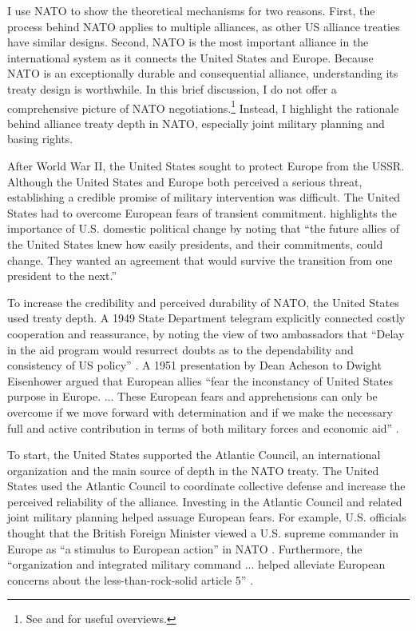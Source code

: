 \documentclass[12pt]{article}
\begin{document}
I use NATO to show the theoretical mechanisms for two reasons. 
First, the process behind NATO applies to multiple alliances, as other US alliance treaties have similar designs. 
Second, NATO is the most important alliance in the international system as it connects the United States and Europe. 
Because NATO is an exceptionally durable and consequential alliance, understanding its treaty design is worthwhile. 
In this brief discussion, I do not offer a comprehensive picture of NATO negotiations.\footnote{See \citet{Kaplan2007} and \citet{Poast2019a} for useful overviews.} 
Instead, I highlight the rationale behind alliance treaty depth in NATO, especially joint military planning and basing rights. 


After World War II, the United States sought to protect Europe from the USSR. 
Although the United States and Europe both perceived a serious threat, establishing a credible promise of military intervention was difficult. 
The United States had to overcome European fears of transient commitment.
\citet[pg. 14]{Sayle2019} highlights the importance of U.S. domestic political change by noting that ``the future allies of the United States knew how easily presidents, and their commitments, could change. They wanted an agreement that would survive the transition from one president to the next.'' 


To increase the credibility and perceived durability of NATO, the United States used treaty depth.  
A 1949 State Department telegram explicitly connected costly cooperation and reassurance, by noting the view of two ambassadors that ``Delay in the aid program would resurrect doubts as to the dependability and consistency of US policy'' \citep{state-summary-0607-49}. 
A 1951 presentation by Dean Acheson to Dwight Eisenhower argued that European allies ``fear the inconstancy of United States purpose in Europe. ... These European fears and apprehensions can only be overcome if we move forward with determination and if we make the necessary full and active contribution in terms of both military forces and economic aid'' \citep[pg. 3]{Acheson1951}. 


To start, the United States supported the Atlantic Council, an international organization and the main source of depth in the NATO treaty. 
The United States used the Atlantic Council to coordinate collective defense and increase the perceived reliability of the alliance. 
Investing in the Atlantic Council and related joint military planning helped assuage European fears. 
For example, U.S. officials thought that the British Foreign Minister viewed a U.S. supreme commander in Europe as ``a stimulus to European action'' in NATO \citep{Acheson1950}. 
Furthermore, the ``organization and integrated military command ... helped alleviate European concerns about the less-than-rock-solid article 5'' \citep[pg. 26]{Sayle2019}.
\end{document}
